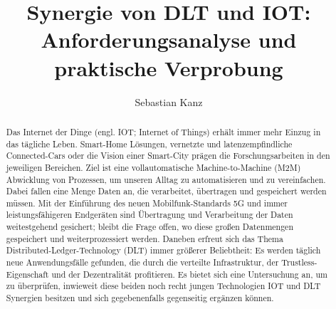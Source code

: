 \documentclass[
    ngerman,american
    ]{scrartcl}
\title{
        Synergie von DLT und IOT: Anforderungsanalyse und praktische Verprobung
        \\  \Large{\paperSubTitle{\lang}}} %
\author{
        Sebastian Kanz
        }
\begin{document}
      \maketitle
        \begin{abstract}
            Das Internet der Dinge (engl. IOT; Internet of Things) erhält immer mehr Einzug in das tägliche Leben. Smart-Home Lösungen, vernetzte und latenzempfindliche Connected-Cars oder die Vision einer Smart-City prägen die Forschungsarbeiten in den jeweiligen Bereichen. Ziel ist eine vollautomatische Machine-to-Machine (M2M) Abwicklung von Prozessen, um unseren Alltag zu automatisieren und zu vereinfachen. Dabei fallen eine Menge Daten an, die verarbeitet, übertragen und gespeichert werden müssen. Mit der Einführung des neuen Mobilfunk-Standards 5G und immer leistungsfähigeren Endgeräten sind Übertragung und Verarbeitung der Daten weitestgehend gesichert; bleibt die Frage offen, wo diese großen Datenmengen gespeichert und weiterprozessiert werden.
            Daneben erfreut sich das Thema Distributed-Ledger-Technology (DLT) immer größerer Beliebtheit: Es werden täglich neue Anwendungsfälle gefunden, die durch die verteilte Infrastruktur, der Trustless-Eigenschaft und der Dezentralität profitieren. Es bietet sich eine Untersuchung an, um zu überprüfen, inwieweit diese beiden noch recht jungen Technologien IOT und DLT Synergien besitzen und sich gegebenenfalls gegenseitig ergänzen können.

\end{abstract}
\end{document}
